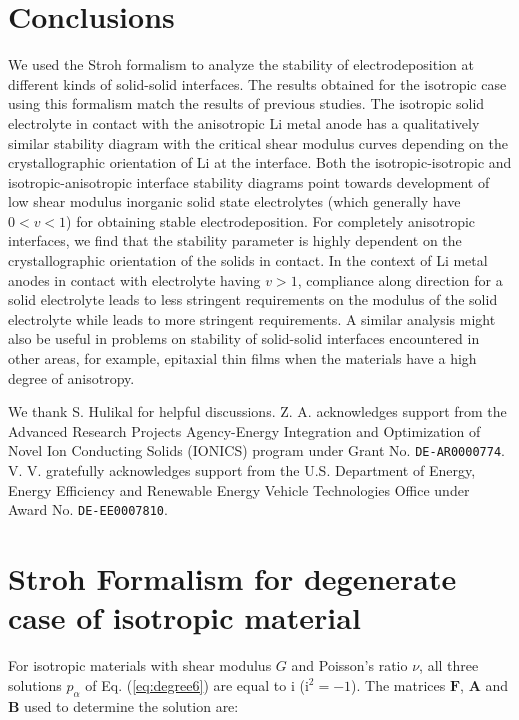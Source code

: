 \documentclass[%
reprint,
 amsmath,amssymb,
 aps,
 prb,
]{revtex4-1}
\newcommand*{\rtten}[1]{\mathbf{\boldsymbol{#1}}}
\begin{document}
\section{Conclusions}\label{sec:concl}
We used the Stroh formalism to analyze the stability of electrodeposition at different kinds of solid-solid interfaces. The results obtained for the isotropic case using this formalism match the results of previous studies. The isotropic solid electrolyte in contact with the anisotropic Li metal anode has a qualitatively similar stability diagram with the critical shear modulus curves depending on the crystallographic orientation of Li at the interface. Both the isotropic-isotropic and isotropic-anisotropic interface stability diagrams point towards development of low shear modulus inorganic solid state electrolytes (which generally have $0<v<1$) for obtaining stable electrodeposition. For completely anisotropic interfaces, we find that the stability parameter is highly dependent on the crystallographic orientation of the solids in contact.  In the context of Li metal anodes in contact with electrolyte having $v>1$, compliance along \hkl[1 0 0] direction for a solid electrolyte leads to less stringent requirements on the modulus of the solid electrolyte while \hkl[1 1 1] leads to more stringent requirements. A similar analysis might also be useful in problems on stability of solid-solid interfaces encountered in other areas, for example, epitaxial thin films when the materials have a high degree of anisotropy.


\begin{acknowledgments}
We thank S. Hulikal for helpful discussions. Z. A. acknowledges support from the Advanced Research Projects Agency-Energy Integration and Optimization of Novel Ion Conducting Solids (IONICS) program under Grant No. \texttt{DE-AR0000774}. V. V. gratefully acknowledges support from the U.S. Department of Energy, Energy Efficiency and Renewable Energy Vehicle Technologies Office under Award No. \texttt{DE-EE0007810}.
\end{acknowledgments}

\appendix

\section{Stroh Formalism for degenerate case of isotropic material}\label{app:degen}
For isotropic materials with shear modulus $G$ and Poisson's ratio $\nu$, all three solutions $p_\alpha$ of Eq. (\ref{eq:degree6}) are equal to i ($\text{i}^2=-1$). The matrices $\rtten{F}$, $\rtten{A}$ and $\rtten{B}$ used to determine the solution are:
\end{document}
